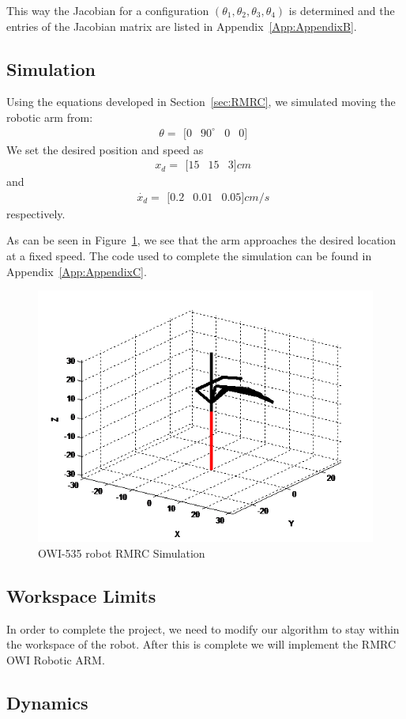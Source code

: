 \documentclass[paper=letter, fontsize=10pt]{scrartcl}	%
\numberwithin{equation}{section}															%
\numberwithin{figure}{section}																%
\numberwithin{table}{section}																%
\begin{document}
This way the Jacobian for a configuration $(\theta_1, \theta_2, \theta_3, \theta_4)$ is determined and the entries of the Jacobian matrix are listed in Appendix~\ref{App:AppendixB}.
\subsection{Simulation}
Using the equations developed in Section~\ref{sec:RMRC}, we simulated moving the robotic arm from:
\[\theta = \begin{matrix}
[0&90^\circ&0&0]
\end{matrix}\]
We set the desired position and speed as
\[x_d = \begin{matrix}
[15&15&3]cm
\end{matrix}\] and
\[\dot{x_d} = \begin{matrix}
[0.2&0.01&0.05]cm/s
\end{matrix}\] respectively.

As can be seen in Figure~\ref{fig:sim}, we see that the arm approaches the desired location at a fixed speed. The code used to complete the simulation can be found in Appendix~\ref{App:AppendixC}.
\begin{figure}[!h]
  \centering
    \includegraphics[width=.75\textwidth]{./Images/sim}
    \caption{OWI-535 robot RMRC Simulation}
    \label{fig:sim}
\end{figure}

\subsection{Workspace Limits}
In order to complete the project, we need to modify our algorithm to stay within the workspace of the robot. After this is complete we will implement the RMRC OWI Robotic ARM.

\subsection{Dynamics}
\end{document}
